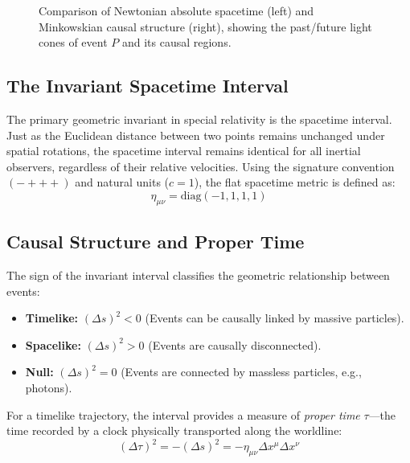 \documentclass[11pt, a4paper]{report}
\begin{document}
\begin{figure}[htbp]
\caption{Comparison of Newtonian absolute spacetime (left) and Minkowskian causal structure (right), showing the past/future light cones of event $P$ and its causal regions.}
\label{fig:spacetime_comparison}
\end{figure}


\subsection*{The Invariant Spacetime Interval}
The primary geometric invariant in special relativity is the spacetime interval. Just as the Euclidean distance between two points remains unchanged under spatial rotations, the spacetime interval remains identical for all inertial observers, regardless of their relative velocities. Using the signature convention $(- + + +)$ and natural units ($c=1$), the flat spacetime metric is defined as:
\begin{equation}\label{eq:minkowski-metric}
\eta_{\mu\nu} = \text{diag}(-1, 1, 1, 1)
\end{equation}

\subsection*{Causal Structure and Proper Time}
The sign of the invariant interval classifies the geometric relationship between events:
\begin{itemize}
\item \textbf{Timelike:} $(\Delta s)^2 < 0$ (Events can be causally linked by massive particles).
\item \textbf{Spacelike:} $(\Delta s)^2 > 0$ (Events are causally disconnected).
\item \textbf{Null:} $(\Delta s)^2 = 0$ (Events are connected by massless particles, e.g., photons).
\end{itemize}
For a timelike trajectory, the interval provides a measure of \emph{proper time} $\tau$---the time recorded by a clock physically transported along the worldline:
\begin{equation}\label{eq:proper-time}
(\Delta \tau)^2 = -(\Delta s)^2 = -\eta_{\mu\nu} \Delta x^\mu \Delta x^\nu
\end{equation}
\end{document}
